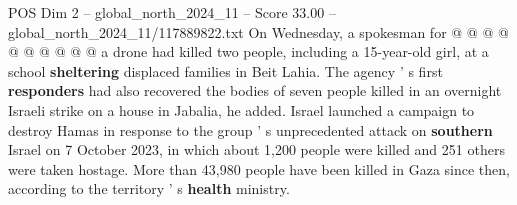 \begin{textsample}{POS Dim 2 – global\_north\_2024\_11 – Score 33.00 – global\_north\_2024\_11/117889822.txt}
On Wednesday, a spokesman for @ @ @ @ @ @ @ @ @ @ a drone had killed two people, including a 15-year-old girl, at a school \textbf{sheltering} displaced families in Beit Lahia.
The agency ' s first \textbf{responders} had also recovered the bodies of seven people killed in an overnight Israeli strike on a house in Jabalia, he added.
Israel launched a campaign to destroy Hamas in response to the group ' s unprecedented attack on \textbf{southern} Israel on 7 October 2023, in which about 1,200 people were killed and 251 others were taken hostage.
More than 43,980 people have been killed in Gaza since then, according to the territory ' s \textbf{health} ministry.

\end{textsample}
